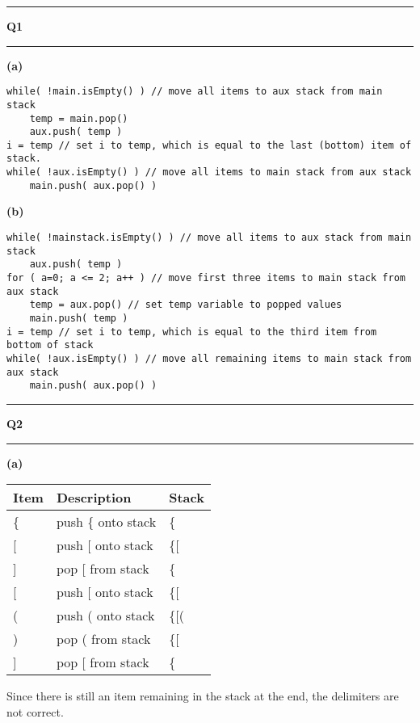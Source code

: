 \documentclass[11pt]{article}
\newcommand\question[2]{\vspace{.25in}\hrule\textbf{#1 #2}\vspace{.5em}\hrule\vspace{.10in}}
\renewcommand\part[1]{\vspace{.10in}\textbf{(#1)}}
\begin{document}
\raggedright
\newcommand\NAME{Sean Connor}  %
\newcommand\HWNUM{2}              %

\question{Q1}{}
 \part{a}
\begin{lstlisting}
while( !main.isEmpty() ) // move all items to aux stack from main stack
	temp = main.pop()
	aux.push( temp )
i = temp // set i to temp, which is equal to the last (bottom) item of stack.
while( !aux.isEmpty() ) // move all items to main stack from aux stack
	main.push( aux.pop() )
\end{lstlisting}
\part{b}
\begin{lstlisting}
while( !mainstack.isEmpty() ) // move all items to aux stack from main stack
	aux.push( temp )
for ( a=0; a <= 2; a++ ) // move first three items to main stack from aux stack
	temp = aux.pop() // set temp variable to popped values
	main.push( temp )
i = temp // set i to temp, which is equal to the third item from bottom of stack
while( !aux.isEmpty() ) // move all remaining items to main stack from aux stack
	main.push( aux.pop() )
\end{lstlisting}

\newpage
\question{Q2}{} 
\part{a} 
\begin{table}[!htbp]
\centering
\begin{tabular}{lll}
Item & Description         & Stack  \\ \hline
\{   & push \{ onto stack  & \{     \\
{[}  & push {[} onto stack & \{{[}  \\
{]}  & pop {[} from stack  & \{     \\
{[}  & push {[} onto stack & \{{[}  \\
(    & push ( onto stack   & \{{[}( \\
)    & pop ( from stack    & \{{[}  \\
{]}  & pop {[} from stack  & \{    
\end{tabular}
\end{table}
Since there is still an item remaining in the stack at the end, the delimiters are not correct.
\end{document}

